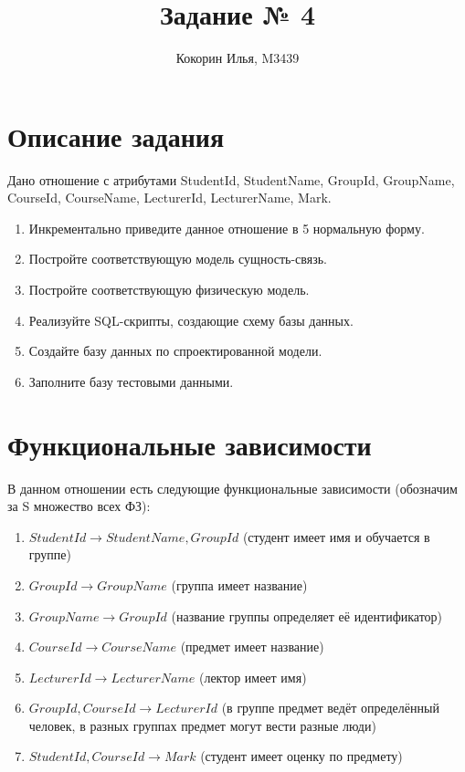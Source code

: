 \documentclass{article}
\title{Задание № 4}
\author{Кокорин Илья, M3439}
\begin{document}
	\maketitle
	
	\section{Описание задания}
	
	Дано отношение с атрибутами StudentId, StudentName, GroupId, GroupName, CourseId, CourseName, LecturerId, LecturerName, Mark.
	
	\begin{enumerate}
		\item Инкрементально приведите данное отношение в 5 нормальную форму.
		\item Постройте соответствующую модель сущность-связь.
		\item Постройте соответствующую физическую модель.
		\item Реализуйте SQL-скрипты, создающие схему базы данных.
		\item Создайте базу данных по спроектированной модели.
		\item Заполните базу тестовыми данными.
	\end{enumerate}

\section{Функциональные зависимости}

В данном отношении есть следующие функциональные зависимости (обозначим за S множество всех ФЗ):

	\begin{enumerate}
		\item $StudentId \rightarrow StudentName, GroupId$ (студент имеет имя и обучается в группе)
		
		\item $GroupId \rightarrow GroupName$ (группа имеет название)
		
		\item $GroupName \rightarrow GroupId$ (название группы определяет её идентификатор)
		
		\item $CourseId \rightarrow CourseName$ (предмет имеет название)
		
		\item $LecturerId \rightarrow LecturerName$ (лектор имеет имя)
		
		\item $GroupId, CourseId \rightarrow LecturerId$ (в группе предмет ведёт определённый человек, в 
		разных группах предмет могут вести разные люди)
		
		\item $StudentId, CourseId \rightarrow Mark$ (студент имеет оценку по предмету)
	\end{enumerate}
	
\end{document}
